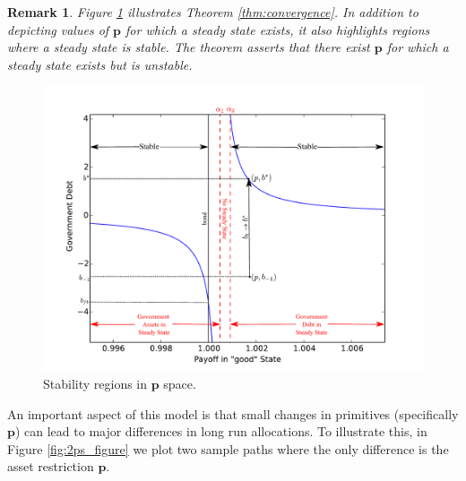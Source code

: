 \documentclass[12pt]{article}
\newtheorem{remark}[theorem]{Remark}
\begin{document}
\begin{remark}  Figure \ref{fig:stable} illustrates  Theorem \ref{thm:convergence}.  In addition to depicting values of $\bm p$ for which a steady state exists, it  also highlights  regions where a steady state is stable. The theorem asserts  that there exist $\bm p$ for which a steady state exists
but is unstable. %
\end{remark}
\begin{figure}[ht]
		\begin{center}
		\includegraphics[width = 5in]{Images/graph_stable.pdf}
\caption{Stability regions in $\bm p$ space.\label{fig:stable}}
	\end{center}
\end{figure}  An important aspect of this model is that small changes in primitives (specifically $\bm p$) can lead to major differences in long run allocations.  To illustrate this, in Figure \ref{fig:2ps_figure} we plot two sample paths where the only difference is the asset restriction $\bm p$.
\end{document}
